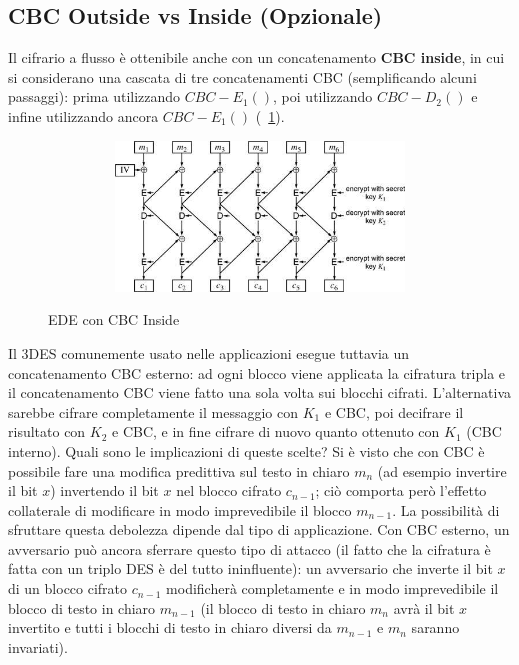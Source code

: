 \subsection{CBC Outside vs Inside (Opzionale)}
Il cifrario a flusso è ottenibile anche con un concatenamento \textbf{CBC inside}, in cui si considerano una cascata di tre concatenamenti CBC (semplificando alcuni passaggi): prima utilizzando $CBC-E_{1}()$, poi utilizzando $CBC-D_{2}()$ e infine utilizzando ancora $CBC-E_{1}()$ (\figurename ~\ref{fig:EDE_CBC_In}).
\begin{figure}[htbp]
	\centering%
	\subfigure%
	{\includegraphics[height=4cm, width=12cm, keepaspectratio]{Immagini/modalita_operative/EDE_CBC_In.png}}
	\caption{EDE con CBC Inside \label{fig:EDE_CBC_In}} 	
\end{figure}
Il 3DES comunemente usato nelle applicazioni esegue tuttavia un concatenamento CBC esterno: ad ogni blocco viene applicata la cifratura tripla e il concatenamento CBC viene fatto una sola volta sui blocchi cifrati. L'alternativa sarebbe cifrare completamente il messaggio con $K_{1}$ e CBC, poi decifrare il risultato con $K_{2}$ e CBC, e in fine cifrare di nuovo quanto ottenuto con $K_{1}$ (CBC interno). Quali sono le implicazioni di queste scelte?
\newline \newline
Si è visto che con CBC è possibile fare una modifica predittiva sul testo in chiaro $m_{n}$ (ad esempio invertire il bit $x$) invertendo il bit $x$ nel blocco cifrato $c_{n-1}$; ciò comporta però l'effetto collaterale di modificare in modo imprevedibile il blocco $m_{n-1}$. La possibilità di sfruttare questa debolezza dipende dal tipo di applicazione.
\newline \newline
Con CBC esterno, un avversario può ancora sferrare questo tipo di attacco (il fatto che la cifratura è fatta con un triplo DES è del tutto ininfluente): un avversario che inverte il bit $x$ di un blocco cifrato $c_{n-1}$ modificherà completamente e in modo imprevedibile il blocco di testo in chiaro $m_{n-1}$ (il blocco di testo in chiaro $m_{n}$ avrà il bit $x$ invertito e tutti i blocchi di testo in chiaro diversi da $m_{n-1}$ e $m_{n}$ saranno invariati).
